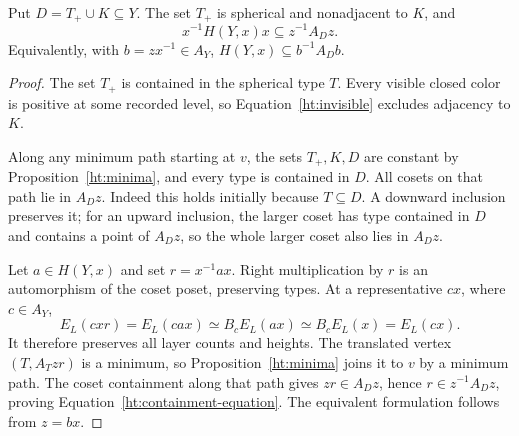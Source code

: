 \begin{proposition}
\label{ht:containment}
Put \(D=T_+\cup K\subseteq Y\).
The set \(T_+\) is spherical and nonadjacent to \(K\), and
\begin{equation}
 x^{-1}H(Y,x)x\subseteq z^{-1}A_Dz.
 \label{ht:containment-equation}
\end{equation}
Equivalently, with \(b=zx^{-1}\in A_Y\),
\(H(Y,x)\subseteq b^{-1}A_Db\).
\end{proposition}

\begin{proof}
The set \(T_+\) is contained in the spherical type \(T\).
Every visible closed color is positive at some recorded level, so
Equation~\eqref{ht:invisible} excludes adjacency to \(K\).

Along any minimum path starting at \(v\), the sets \(T_+,K,D\) are
constant by Proposition~\ref{ht:minima}, and every type is contained
in \(D\).
All cosets on that path lie in \(A_Dz\).
Indeed this holds initially because \(T\subseteq D\).
A downward inclusion preserves it; for an upward inclusion, the larger
coset has type contained in \(D\) and contains a point of \(A_Dz\), so
the whole larger coset also lies in \(A_Dz\).

Let \(a\in H(Y,x)\) and set \(r=x^{-1}ax\).
Right multiplication by \(r\) is an automorphism of the coset poset,
preserving types.  At a representative \(cx\), where \(c\in A_Y\),
\[
 E_L(cxr)=E_L(cax)\simeq B_cE_L(ax)
 \simeq B_cE_L(x)=E_L(cx).
\]
It therefore preserves all layer counts and heights.
The translated vertex \((T,A_Tzr)\) is a minimum, so
Proposition~\ref{ht:minima} joins it to \(v\) by a minimum path.
The coset containment along that path gives \(zr\in A_Dz\), hence
\(r\in z^{-1}A_Dz\), proving Equation~\eqref{ht:containment-equation}.
The equivalent formulation follows from \(z=bx\).
\end{proof}
